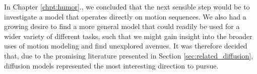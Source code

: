 
In Chapter \ref{chpt:humor}., we concluded that the next sensible step would be to investigate a model that operates directly on motion sequences. We also had a growing desire to find a more general model that could readily be used for a wider variety of different tasks, such that we might gain insight into the broader uses of motion modeling and find unexplored avenues. It was therefore decided that, due to the promising literature presented in Section \ref{sec:related_diffusion}, diffusion models represented the most interesting direction to pursue.
